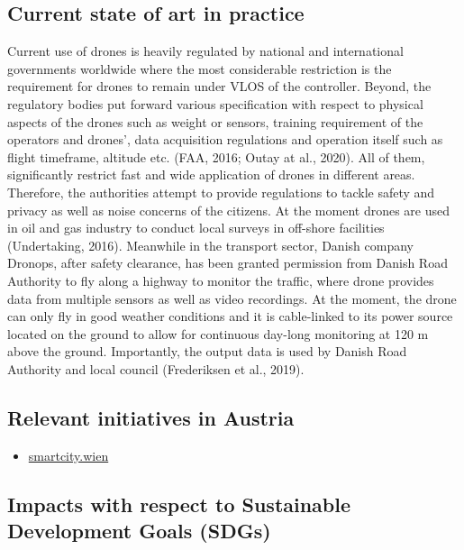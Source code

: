 \documentclass[
]{book}
\providecommand{\tightlist}{%
  \setlength{\itemsep}{0pt}\setlength{\parskip}{0pt}}
\begin{document}
\hypertarget{current-state-of-art-in-practice-4}{%
\subsection*{Current state of art in practice}\label{current-state-of-art-in-practice-4}}

Current use of drones is heavily regulated by national and international governments worldwide where the most considerable restriction is the requirement for drones to remain under VLOS of the controller. Beyond, the regulatory bodies put forward various specification with respect to physical aspects of the drones such as weight or sensors, training requirement of the operators and drones', data acquisition regulations and operation itself such as flight timeframe, altitude etc. (FAA, 2016; Outay at al., 2020). All of them, significantly restrict fast and wide application of drones in different areas. Therefore, the authorities attempt to provide regulations to tackle safety and privacy as well as noise concerns of the citizens. At the moment drones are used in oil and gas industry to conduct local surveys in off-shore facilities (Undertaking, 2016). Meanwhile in the transport sector, Danish company Dronops, after safety clearance, has been granted permission from Danish Road Authority to fly along a highway to monitor the traffic, where drone provides data from multiple sensors as well as video recordings. At the moment, the drone can only fly in good weather conditions and it is cable-linked to its power source located on the ground to allow for continuous day-long monitoring at 120 m above the ground. Importantly, the output data is used by Danish Road Authority and local council (Frederiksen et al., 2019).

\hypertarget{relevant-initiatives-in-austria-4}{%
\subsection*{Relevant initiatives in Austria}\label{relevant-initiatives-in-austria-4}}

\begin{itemize}
\tightlist
\item
  \href{https://smartcity.wien.gv.at/site/en/smart-inspection/}{smartcity.wien}
\end{itemize}

\hypertarget{impacts-with-respect-to-sustainable-development-goals-sdgs-4}{%
\subsection*{Impacts with respect to Sustainable Development Goals (SDGs)}\label{impacts-with-respect-to-sustainable-development-goals-sdgs-4}}
\end{document}
